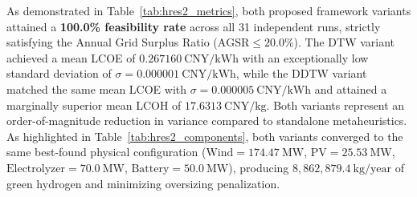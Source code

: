\documentclass[review]{elsarticle}
\begin{document}
\begin{table}[htbp]
\centering
\caption{Best-found physical system component sizing and annual green hydrogen production for the HRES2-H2 microgrid.}
\label{tab:hres2_components}
\end{table}


As demonstrated in Table~\ref{tab:hres2_metrics}, both proposed framework variants attained a \textbf{100.0\% feasibility rate} across all 31 independent runs, strictly satisfying the Annual Grid Surplus Ratio ($\text{AGSR} \le 20.0\%$). The DTW variant achieved a mean LCOE of $0.267160~\text{CNY/kWh}$ with an exceptionally low standard deviation of $\sigma = 0.000001~\text{CNY/kWh}$, while the DDTW variant matched the same mean LCOE with $\sigma = 0.000005~\text{CNY/kWh}$ and attained a marginally superior mean LCOH of $17.6313~\text{CNY/kg}$. Both variants represent an order-of-magnitude reduction in variance compared to standalone metaheuristics. As highlighted in Table~\ref{tab:hres2_components}, both variants converged to the same best-found physical configuration ($\text{Wind} = 174.47~\text{MW}$, $\text{PV} = 25.53~\text{MW}$, $\text{Electrolyzer} = 70.0~\text{MW}$, $\text{Battery} = 50.0~\text{MW}$), producing $8,862,879.4~\text{kg/year}$ of green hydrogen and minimizing oversizing penalization.
\end{document}
